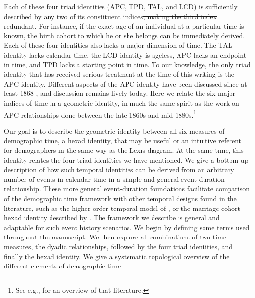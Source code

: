 \documentclass[12pt,oneside,a4paper]{article} %
\begin{document}
Each of these four triad identities (APC, TPD, TAL, and LCD) is sufficiently
described by any two of its constituent indices\st{, making the third index
redundant}. For instance, if the exact age of an individual at a particular
time is known, the birth cohort to which he or she belongs can be immediately derived. Each of these four identities also lacks a major dimension of time. The TAL identity lacks calendar time, the LCD identity is ageless, APC lacks an endpoint in time, and TPD lacks a starting point in time.
To our knowledge, the only triad identity that has received serious
treatment at the time of this writing is the APC identity. Different
aspects of the APC identity have been discussed since at least 1868
\citep{knapp1868ermittlung}, and discussion remains lively today. Here we relate the six major indices of time in a geometric identity, in much the same spirit as the work on APC relationships done between the late
1860s and mid 1880s.\footnote{See e.g., \citet{keiding2011age} for an overview of that literature.} 

Our goal is to describe the geometric identity between all
six measures of demographic time, a hexad identity, that may be useful or an intuitive
referent for demographers in the same way as the Lexis diagram. At the same
time, this identity relates the four triad identities we have mentioned. We give a bottom-up
description of how such temporal identities can be derived from an
arbitrary number of events in calendar time in a simple and general
event-duration relationship. These more general event-duration foundations
facilitate comparison of the demographic time framework with other temporal designs found in the
literature, such as the higher-order temporal model of \citet{brinks2014lexis},
or the marriage cohort hexad identity described by \citet{lexis1875einleitung}.
The framework we describe is general and adaptable for such event history scenarios.
We begin by defining some terms used throughout the manuscript.
We then explore all combinations of two time measures, the dyadic relationships, followed by the four triad identities, and
finally the hexad identity. We give a systematic topological overview of the
different elements of demographic time. 
\end{document}

